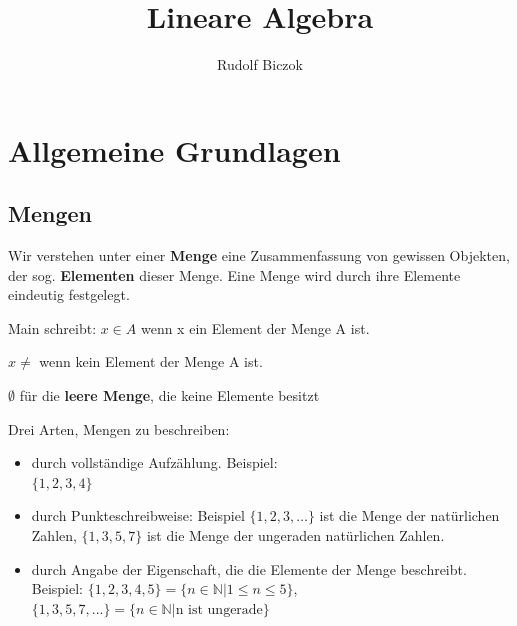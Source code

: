 \documentclass{scrartcl}
\newcommand{\titleText}{Lineare Algebra}
\newcommand{\mainAuthor}{Rudolf Biczok}
\newcommand{\authorText}{\mainAuthor}
\begin{document}


\title{\titleText}
\author{\authorText}

\maketitle


\tableofcontents


\section{Allgemeine Grundlagen}

\subsection{Mengen}

Wir verstehen unter einer \textbf{Menge} eine Zusammenfassung von gewissen Objekten, der sog. \textbf{Elementen} dieser Menge. Eine Menge wird durch ihre Elemente eindeutig festgelegt.  

Main schreibt: $x \in A$ wenn x ein Element der Menge A ist.

$x \ne $ wenn kein Element der Menge A ist.

$ \emptyset$ für die \textbf{leere Menge}, die keine Elemente besitzt

Drei Arten, Mengen zu beschreiben:

\begin{itemize}
 \item durch vollständige Aufzählung. Beispiel: \\
  $ \{1,2,3,4\}$
  \item durch Punkteschreibweise: Beispiel $\{1,2,3,\ldots\}$
  ist die Menge der natürlichen Zahlen, $\{1,3,5,7\}$ ist die Menge der ungeraden natürlichen Zahlen.
  \item durch Angabe der Eigenschaft, die die Elemente der Menge beschreibt. Beispiel: $\{1,2,3,4,5\}=\{n \in \mathbb{N}| 1\leq n \leq 5\}$, $\{ 1,3,5,7,... \}=\{n \in \mathbb{N} | \text{n ist ungerade}\}$
\end{itemize}
\end{document}

